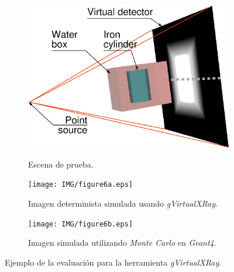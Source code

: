 \begin{figure}[h]
    \begin{subfigure}[b]{0.25\linewidth}
        \centering
        {\includegraphics[width=0.8\linewidth]{IMG/figure3a.eps}}
        \caption{\label{subfig:polychromatismA} Escena de prueba.}
    \end{subfigure}
    \null\hfill
     \begin{subfigure}[b]{0.25\linewidth}
        \centering
        {\texttt{[image: IMG/figure6a.eps]}}
        \caption{\label{subfig:GPU} Imagen determinista simulada  usando \emph{gVirtualXRay}.}
    \end{subfigure}
    \null\hfill
    \begin{subfigure}[b]{0.25\linewidth}
        \centering
        {\texttt{[image: IMG/figure6b.eps]}}
        \caption{\label{subfig:Gate} Imagen simulada utilizando \emph{Monte Carlo} en \emph{Geant4}.}
    \end{subfigure}

\caption{\label{fig:validation} Ejemplo de la evaluación para la herramienta \emph{gVirtualXRay}.}
\end{figure}


